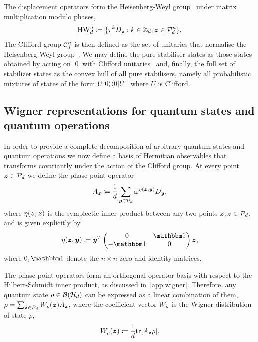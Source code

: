 \documentclass[pra,
aps,
twocolumn,
superscriptaddress,
groupedaddress,
nofootinbib,
reprint
]{revtex4-1}
\begin{document}
The displacement operators form the Heisenberg-Weyl group~\cite{Folland_1989, Bengtsson_2006} under matrix multiplication modulo phases,
\begin{equation}\label{eq:gp}
    {\rm{HW}}_d^n \coloneqq \{ \tau^k D_{\bmz}: k \in \mathbb{Z}_d, \bmz \in \cal{P}_d^n\}.
\end{equation}
The Clifford group $ \cal{C}_d^n $ is then defined as the set of unitaries that normalise the Heisenberg-Weyl group~\cite{Appleby_2005}. We may define the pure stabiliser states as those states obtained by acting on $|0\>$ with Clifford unitaries~\cite{cit:gross3} and, finally, the full set of stabilizer states as the convex hull of all pure stabilisers, namely all probabilistic mixtures of states of the form $U|0\>\<0|U^\dagger$ where $U$ is Clifford. 

\subsection{Wigner representations for quantum states and quantum operations}\label{sec:wigner}

In order to provide a complete decomposition of arbitrary quantum states and quantum operations we now define a basis of Hermitian observables that transforms covariantly under the action of the Clifford group. At every point $\bmz \in \P_d$ we define the phase-point operator
\begin{equation}\label{eq:ax}
	A_{\bmz} \coloneqq \frac{1}{d} \sum_{\bmy \in \cal{P}_d} \omega^{\eta(\bmz, \bmy)} D_{\bmy}, 
\end{equation}
where $\eta(\bmz, \bmz)$ is the symplectic inner product between any two points $\bmz,\z \in \P_d$, and is given explicitly by
\begin{equation}
	\eta(\bmz, \bmy) \coloneqq \bmy^T \begin{pmatrix}
		0  & \id \\ %
		-\id & 0 \\ %
	\end{pmatrix} \bmz,
\end{equation}
where $0, \id$ denote the $n\times n$ zero and identity matrices.

The phase-point operators form an orthogonal operator basis with respect to the Hilbert-Schmidt inner product, as discussed in~\cref{app:wigner}.
Therefore, any quantum state $\rho \in \cal{B}(\cal{H}_d)$ can be expressed as a linear combination of them, $\rho = \sum_{\bmz \in \cal{P}_d} \W[\bmz]{\rho} A_{\bmz}$, where the coefficient vector $\W{\rho}$ is the Wigner distribution of state $\rho$,
\begin{equation}\label{eq:wstate}
    \W[\bmz]{\rho} \coloneqq \frac{1}{d}\tr[A_{\bmz} \rho].
\end{equation}
\end{document}
